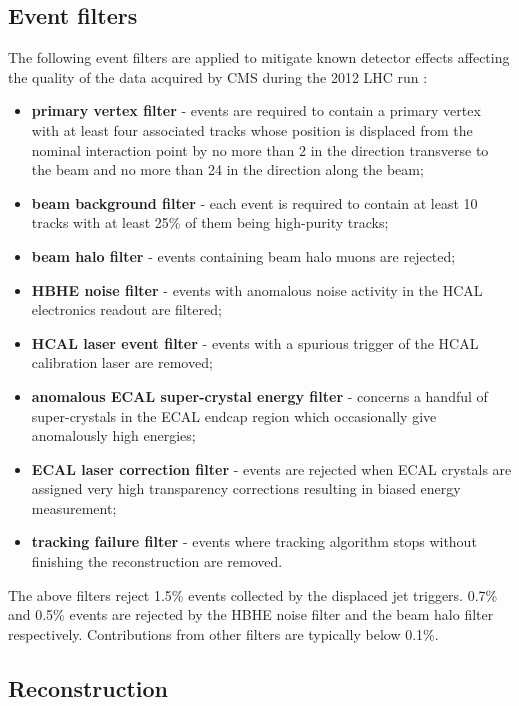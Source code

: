 
\subsection{Event filters}

The following event filters are applied to mitigate known detector effects affecting the quality of the data
acquired by CMS during the 2012 LHC run \cite{METFilters}:
\begin{itemize}
\item {\bf primary vertex filter} - events are required to contain a primary vertex with at least four associated
tracks whose position is displaced from the nominal interaction point by no more than 2 \cm in the direction
transverse to the beam and no more than 24 \cm in the direction along the beam;
\item {\bf beam background filter} - each event is required to contain at least 10 tracks with at least 25\% of them 
being high-purity tracks;
\item {\bf beam halo filter} - events containing beam halo muons are rejected;
\item {\bf HBHE noise filter} - events with anomalous noise activity in the HCAL electronics readout are filtered;
\item {\bf HCAL laser event filter} - events with a spurious trigger of the HCAL calibration laser are removed;
\item {\bf anomalous ECAL super-crystal energy filter} - concerns a handful of super-crystals in the ECAL endcap region
which occasionally give anomalously high energies;
\item {\bf ECAL laser correction filter} - events are rejected when ECAL crystals are assigned very high transparency
corrections resulting in biased energy measurement;
\item {\bf tracking failure filter} - events where tracking algorithm stops without finishing the reconstruction 
are removed.   
\end{itemize}

The above filters reject 1.5\% events collected by the displaced jet triggers. 0.7\% and 0.5\% events are rejected
by the HBHE noise filter and the beam halo filter respectively. Contributions from other filters are typically
below 0.1\%. 

\subsection{Reconstruction}


